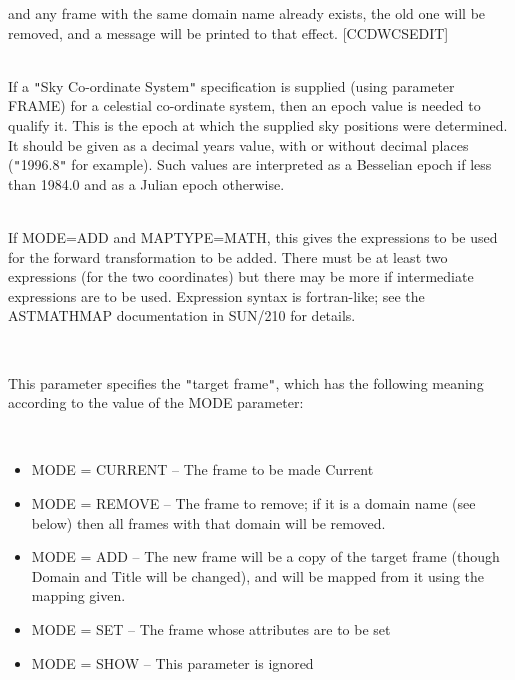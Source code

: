 \documentclass[twoside,11pt]{article}
\renewcommand{\_}{\texttt{\symbol{95}}}
\newcommand{\qt}[1]{{\tt "}#1{\tt "}}
\newcommand{\sstsubsection}[1]{ \item[{#1}] \mbox{} \\}
\newcommand{\sstitemlist}[1]{
  \mbox{} \\
  \vspace{-3.5ex}
  \begin{itemize}
     #1
  \end{itemize}
}
\newcommand{\sstitem}{\item}
\newcommand{\sstsubsection}[1]{\item[{#1}]}
\newcommand{\sstitemlist}[1]{
      \begin{itemize}
         #1
      \end{itemize}
      \\
   }
\newcommand{\sstitem}{\item}
\begin{document}
{{{         and any frame with the same domain name already exists, the
         old one will be removed, and a message will be printed to that
         effect.
         [CCD\_WCSEDIT]
      }
      \sstsubsection{
         EPOCH = \_DOUBLE (Read)
      } {
         If a \qt{Sky Co-ordinate System} specification is supplied (using
         parameter FRAME) for a celestial co-ordinate system, then
         an epoch value is needed to qualify it. This is the epoch at
         which the supplied sky positions were determined. It should be
         given as a decimal years value, with or without decimal places
         (\qt{1996.8} for example). Such values are interpreted as a
         Besselian epoch if less than 1984.0 and as a Julian epoch
         otherwise.
      }
      \sstsubsection{
         FOREXP $*$ ( $*$ ) = LITERAL (Read)
      }{
         If MODE=ADD and MAPTYPE=MATH, this gives the expressions to
         be used for the forward transformation to be added.  There
         must be at least two expressions (for the two coordinates)
         but there may be more if intermediate expressions are to
         be used.  Expression syntax is fortran-like; see the
         AST\_MATHMAP documentation in SUN/210 for details.
      }
      \sstsubsection{
         FRAME = LITERAL (Read)
      } {
         This parameter specifies the \qt{target frame}, which has the
         following meaning according to the value of the MODE parameter:
         \sstitemlist{
            \sstitem
               MODE = CURRENT -- The frame to be made Current
            \sstitem
               MODE = REMOVE  -- The frame to remove; if it is a domain
                                 name (see below) then all frames with
                                 that domain will be removed.
            \sstitem
                MODE = ADD    -- The new frame will be a copy of the
                                 target frame (though Domain and Title
                                 will be changed), and will be mapped 
                                 from it using the mapping given.
            \sstitem
               MODE = SET     -- The frame whose attributes are to be set
            \sstitem
               MODE = SHOW    -- This parameter is ignored
         }

}}}
\end{document}

